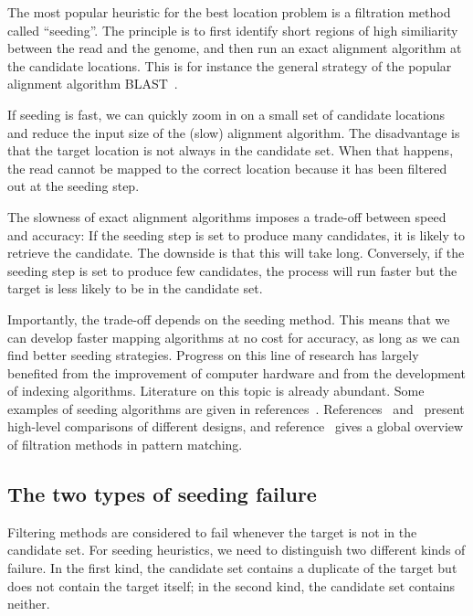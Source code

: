 \documentclass{article}
\begin{document}
The most popular heuristic for the best location problem is a filtration
method called ``seeding''. The principle is to first identify short
regions of high similiarity between the read and the genome, and then run
an exact alignment algorithm at the candidate locations. This is for
instance the general strategy of the popular alignment algorithm
BLAST~\cite{pmid2231712}.

If seeding is fast, we can quickly zoom in on a small set of candidate
locations and reduce the input size of the (slow) alignment algorithm. The
disadvantage is that the target location is not always in the candidate
set. When that happens, the read cannot be mapped to the correct location
because it has been filtered out at the seeding step.

The slowness of exact alignment algorithms imposes a trade-off between
speed and accuracy: If the seeding step is set to produce many candidates,
it is likely to retrieve the candidate. The downside is that this will
take long. Conversely, if the seeding step is set to produce few
candidates, the process will run faster but the target is less likely to
be in the candidate set.

Importantly, the trade-off depends on the seeding method. This means that
we can develop faster mapping algorithms at no cost for accuracy, as long
as we can find better seeding strategies. Progress on this line of
research has largely benefited from the improvement of computer hardware
and from the development of indexing algorithms. Literature on this topic
is already abundant. Some examples of seeding algorithms are given in
references~\cite{sun2005designing, pmid11934743, xu2006optimizing,
kucherov2005multiseed, brejova2003vector, pmid18684737, pmid15359419}.
References~\cite{pmid16533404} and~\cite{pmid20460430} present high-level
comparisons of different designs, and reference~\cite{navarro2001guided}
gives a global overview of filtration methods in pattern matching.

\subsection{The two types of seeding failure}
\label{sec:twotypes}

Filtering methods are considered to fail whenever the target is not in the
candidate set. For seeding heuristics, we need to distinguish two
different kinds of failure. In the first kind, the candidate set contains 
a duplicate of the target but does not contain the target itself; in the
second kind, the candidate set contains neither.
\end{document}
